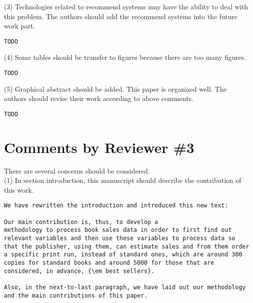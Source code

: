 \documentclass[preprint]{elsarticle}
\begin{document}
\noindent (3) Technologies related to recommend systems may have the ability to deal with this problem. The authors should add the recommend systems into the future work part.\\

\begin{verbatim}
TODO
\end{verbatim}


\noindent (4) Some tables should be transfer to figures because there are too many figures.\\

\begin{verbatim}
TODO
\end{verbatim}


\noindent (5) Graphical abstract should be added. This paper is organized well. The authors should revise their work according to above comments.\\

\begin{verbatim}
TODO
\end{verbatim}



\section{Comments by Reviewer \#3}

\noindent There are several concerns should be considered. \\


\noindent (1) In section introduction, this manuscript should describe the contribution of this work.\\

\begin{verbatim}
We have rewritten the introduction and introduced this new text:

Our main contribution is, thus, to develop a
methodology to process book sales data in order to first find out
relevant variables and then use these variables to process data so
that the publisher, using them, can estimate sales and from them order
a specific print run, instead of standard ones, which are around 300
copies for standard books and around 5000 for those that are
considered, in advance, {\em best sellers}.

Also, in the next-to-last paragraph, we have laid out our methodology 
and the main contributions of this paper.

\end{verbatim}
\end{document}
